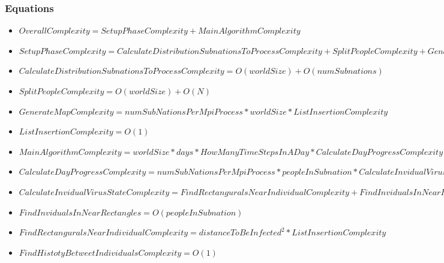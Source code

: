 \documentclass[table, 12pt]{article}
\begin{document}
\subsubsection{Equations}
\begin{flushleft}
\begin{itemize}
\setlength\itemsep{-0.5em}
\item $ OverallComplexity = SetupPhaseComplexity + MainAlgorithmComplexity $
\item $ SetupPhaseComplexity = CalculateDistributionSubnationsToProcessComplexity +  SplitPeopleComplexity + GenerateMapComplexity $
\item $ CalculateDistributionSubnationsToProcessComplexity = O(worldSize) + O(numSubnations)$
\item $ SplitPeopleComplexity = O(worldSize) + O(N) $
\item $ GenerateMapComplexity = numSubNationsPerMpiProcess * worldSize * ListInsertionComplexity $
\item $ ListInsertionComplexity = O(1) $ 
\item $ MainAlgorithmComplexity = worldSize * days * HowManyTimeStepsInADay *  CalculateDayProgressComplexity $ 
\item $ CalculateDayProgressComplexity = numSubNationsPerMpiProcess * peopleInSubnation * CalculateInvidualVirusStateComplexity $
\item $ CalculateInvidualVirusStateComplexity = FindRectanguralsNearIndividualComplexity + FindInvidualsInNearRectangles + NumPeopleNearIndividual * FindHistotyBetweetIndividualsComplexity $
\item $ FindInvidualsInNearRectangles = O(peopleInSubnation) $
\item $ FindRectanguralsNearIndividualComplexity = distanceToBeInfected^2 * ListInsertionComplexity $ 
\item $ FindHistotyBetweetIndividualsComplexity = O(1)$
\end{itemize}
\end{flushleft}
\end{document}
